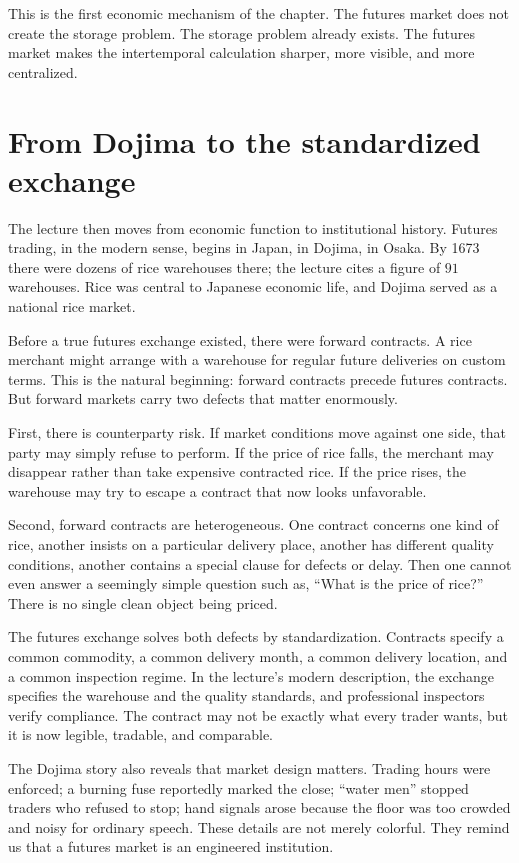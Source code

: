 This is the first economic mechanism of the chapter. The futures market does not create the storage problem. The storage problem already exists. The futures market makes the intertemporal calculation sharper, more visible, and more centralized.

\section{From Dojima to the standardized exchange}

The lecture then moves from economic function to institutional history. Futures trading, in the modern sense, begins in Japan, in Dojima, in Osaka. By 1673 there were dozens of rice warehouses there; the lecture cites a figure of $91$ warehouses. Rice was central to Japanese economic life, and Dojima served as a national rice market.

Before a true futures exchange existed, there were forward contracts. A rice merchant might arrange with a warehouse for regular future deliveries on custom terms. This is the natural beginning: forward contracts precede futures contracts. But forward markets carry two defects that matter enormously.

First, there is counterparty risk. If market conditions move against one side, that party may simply refuse to perform. If the price of rice falls, the merchant may disappear rather than take expensive contracted rice. If the price rises, the warehouse may try to escape a contract that now looks unfavorable.

Second, forward contracts are heterogeneous. One contract concerns one kind of rice, another insists on a particular delivery place, another has different quality conditions, another contains a special clause for defects or delay. Then one cannot even answer a seemingly simple question such as, ``What is the price of rice?'' There is no single clean object being priced.

The futures exchange solves both defects by standardization. Contracts specify a common commodity, a common delivery month, a common delivery location, and a common inspection regime. In the lecture's modern description, the exchange specifies the warehouse and the quality standards, and professional inspectors verify compliance. The contract may not be exactly what every trader wants, but it is now legible, tradable, and comparable.

The Dojima story also reveals that market design matters. Trading hours were enforced; a burning fuse reportedly marked the close; ``water men'' stopped traders who refused to stop; hand signals arose because the floor was too crowded and noisy for ordinary speech. These details are not merely colorful. They remind us that a futures market is an engineered institution.

